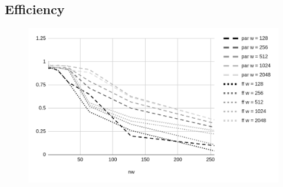 \subsection{Efficiency}
\begin{figure}[H]
    \centering
    \includegraphics[width=\linewidth]{assets/efficiency}
    \bigskip
\end{figure}
